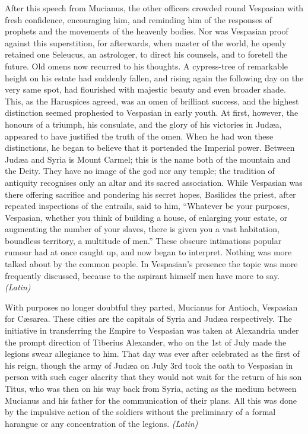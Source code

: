 After this speech from Mucianus, the other officers crowded round Vespasian with fresh confidence, encouraging him, and reminding him of the responses of prophets and the movements of the heavenly bodies. Nor was Vespasian proof against this superstition, for afterwards, when master of the world, he openly retained one Seleucus, an astrologer, to direct his counsels, and to foretell the future. Old omens now recurred to his thoughts. A cypress-tree of remarkable height on his estate had suddenly fallen, and rising again the following day on the very same spot, had flourished with majestic beauty and even broader shade. This, as the Haruspices agreed, was an omen of brilliant success, and the highest distinction seemed prophesied to Vespasian in early youth. At first, however, the honours of a triumph, his consulate, and the glory of his victories in Judæa, appeared to have justified the truth of the omen. When he had won these distinctions, he began to believe that it portended the Imperial power. Between Judæa and Syria is Mount Carmel; this is the name both of the mountain and the Deity. They have no image of the god nor any temple; the tradition of antiquity recognises only an altar and its sacred association. While Vespasian was there offering sacrifice and pondering his secret hopes, Basilides the priest, after repeated inspections of the entrails, said to him, ``Whatever be your purposes, Vespasian, whether you think of building a house, of enlarging your estate, or augmenting the number of your slaves, there is given you a vast habitation, boundless territory, a multitude of men.'' These obscure intimations popular rumour had at once caught up, and now began to interpret. Nothing was more talked about by the common people. In Vespasian's presence the topic was more frequently discussed, because to the aspirant himself men have more to say. \emph{(Latin)}


With purposes no longer doubtful they parted, Mucianus for Antioch, Vespasian for Cæsarea. These cities are the capitals of Syria and Judæa respectively. The initiative in transferring the Empire to Vespasian was taken at Alexandria under the prompt direction of Tiberius Alexander, who on the 1st of July made the legions swear allegiance to him. That day was ever after celebrated as the first of his reign, though the army of Judæa on July 3rd took the oath to Vespasian in person with such eager alacrity that they would not wait for the return of his son Titus, who was then on his way back from Syria, acting as the medium between Mucianus and his father for the communication of their plans. All this was done by the impulsive action of the soldiers without the preliminary of a formal harangue or any concentration of the legions. \emph{(Latin)}

